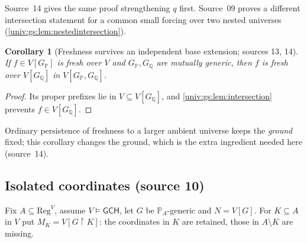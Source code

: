 \documentclass[11pt,letterpaper]{article}
\numberwithin{equation}{section}
\newtheorem{corollary}[corollary]{Corollary}
\theoremstyle{definition}
\theoremstyle{remark}
\newcommand{\res}{\mathbin{\upharpoonright}}
\newcommand{\Reg}{\mathrm{Reg}}
\newcommand{\GCH}{\mathsf{GCH}}
\begin{document}
Source~14 gives the same proof strengthening $q$ first. Source~09 proves a different
intersection statement for a common small forcing over two nested universes
(\cref{univ:gs:lem:nestedintersection}).

\begin{corollary}[Freshness survives an independent base extension; sources 13, 14]\label{univ:gs:cor:independent}
If $f\in V[G_{\mathbb P}]$ is fresh over $V$ and $G_{\mathbb P},G_{\mathbb Q}$ are mutually
generic, then $f$ is fresh over $V[G_{\mathbb Q}]$ in $V[G_{\mathbb P},G_{\mathbb Q}]$.
\end{corollary}
\begin{proof}
Its proper prefixes lie in $V\subseteq V[G_{\mathbb Q}]$, and
\cref{univ:gs:lem:intersection} prevents $f\in V[G_{\mathbb Q}]$.
\end{proof}

Ordinary persistence of freshness to a larger ambient universe keeps the \emph{ground}
fixed; this corollary changes the ground, which is the extra ingredient needed here
(source~14).

\subsection{Isolated coordinates (source 10)}

Fix $A\subseteq\Reg^V$, assume $V\models\GCH$, let $G$ be $\mathbb P_A$-generic and
$N=V[G]$. For $K\subseteq A$ in $V$ put $M_K=V[G\res K]$: the coordinates in $K$ are
retained, those in $A\setminus K$ are missing.
\end{document}
